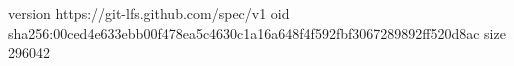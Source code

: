 version https://git-lfs.github.com/spec/v1
oid sha256:00ced4e633ebb00f478ea5c4630c1a16a648f4f592fbf3067289892ff520d8ac
size 296042
